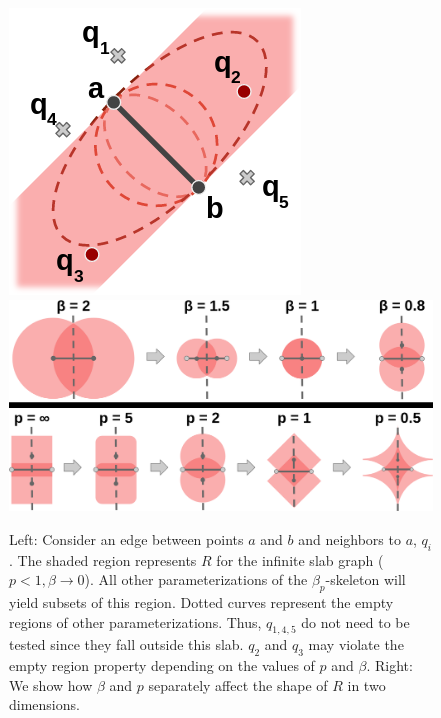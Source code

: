 \begin{figure}[h]
    \includegraphics[width=0.34\linewidth]{figs/chap7/infinite_slab.png}
    \includegraphics[width=0.64\linewidth]{figs/chap7/variable_parameters.png}
    \caption[Illustration of various $\beta_p$-skeleton shapes]{Left: Consider an edge between points $a$ and $b$ and neighbors to $a$, $q_{i}$.
    The shaded region represents $R$ for the infinite slab graph ($p < 1, \beta \rightarrow 0$).
    All other parameterizations of the $\beta_p$-skeleton will yield subsets of this region.
    Dotted curves represent the empty regions of other parameterizations.
    Thus, $q_{1,4,5}$ do not need to be tested since they fall outside this slab.
    $q_2$ and $q_3$ may violate the empty region property depending on the values of $p$ and $\beta$.
    Right: We show how $\beta$ and $p$ separately affect the shape of $R$ in two dimensions.}
    \label{fig:infinite_slab}
\end{figure}

